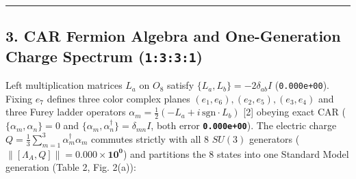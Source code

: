 \documentclass[
  a4paper,
]{article}
\begin{document}
\begin{center}\rule{0.5\linewidth}{0.5pt}\end{center}

\subsection{\texorpdfstring{3. CAR Fermion Algebra and One-Generation
Charge Spectrum
(\texttt{1:3:3:1})}{3. CAR Fermion Algebra and One-Generation Charge Spectrum (1:3:3:1)}}\label{car-fermion-algebra-and-one-generation-charge-spectrum-1331}

Left multiplication matrices \(L_a\) on \(O_8\) satisfy
\(\{L_a, L_b\} = -2\delta_{ab}I\) (\texttt{0.000e+00}). Fixing \(e_7\)
defines three color complex planes \((e_1,e_6), (e_2,e_5), (e_3,e_4)\)
and three Furey ladder operators
\(\alpha_m = \frac{1}{2}(-L_a + i\,\mathrm{sgn}\cdot L_b)\) {[}2{]}
obeying exact CAR (\(\{\alpha_m, \alpha_n\} = 0\) and
\(\{\alpha_m, \alpha_n^\dagger\} = \delta_{mn}I\), both error
\textbf{\texttt{0.000e+00}}). The electric charge
\(Q = \frac{1}{3}\sum_{m=1}^3 \alpha_m^\dagger \alpha_m\) commutes
strictly with all 8 \(SU(3)\) generators
(\(\|[\Lambda_A, Q]\| = \mathbf{0.000\times 10^0}\)) and partitions the
8 states into one Standard Model generation (Table 2, Fig. 2(a)):
\end{document}
